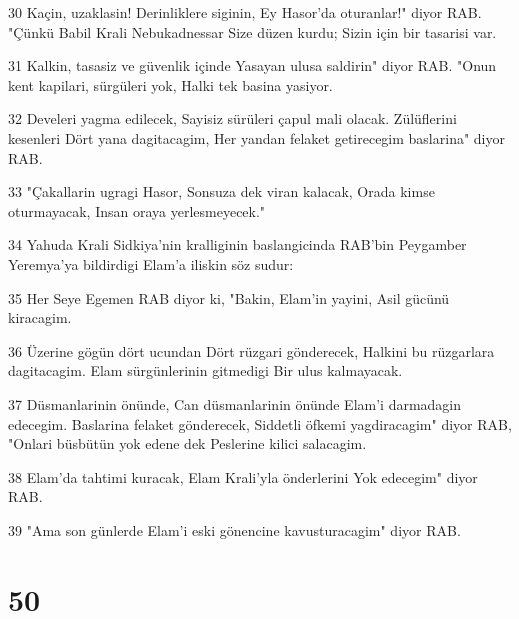 \par 30 Kaçin, uzaklasin! Derinliklere siginin, Ey Hasor'da oturanlar!" diyor RAB. "Çünkü Babil Krali Nebukadnessar Size düzen kurdu; Sizin için bir tasarisi var.
\par 31 Kalkin, tasasiz ve güvenlik içinde Yasayan ulusa saldirin" diyor RAB. "Onun kent kapilari, sürgüleri yok, Halki tek basina yasiyor.
\par 32 Develeri yagma edilecek, Sayisiz sürüleri çapul mali olacak. Zülüflerini kesenleri Dört yana dagitacagim, Her yandan felaket getirecegim baslarina" diyor RAB.
\par 33 "Çakallarin ugragi Hasor, Sonsuza dek viran kalacak, Orada kimse oturmayacak, Insan oraya yerlesmeyecek."
\par 34 Yahuda Krali Sidkiya'nin kralliginin baslangicinda RAB'bin Peygamber Yeremya'ya bildirdigi Elam'a iliskin söz sudur:
\par 35 Her Seye Egemen RAB diyor ki, "Bakin, Elam'in yayini, Asil gücünü kiracagim.
\par 36 Üzerine gögün dört ucundan Dört rüzgari gönderecek, Halkini bu rüzgarlara dagitacagim. Elam sürgünlerinin gitmedigi Bir ulus kalmayacak.
\par 37 Düsmanlarinin önünde, Can düsmanlarinin önünde Elam'i darmadagin edecegim. Baslarina felaket gönderecek, Siddetli öfkemi yagdiracagim" diyor RAB, "Onlari büsbütün yok edene dek Peslerine kilici salacagim.
\par 38 Elam'da tahtimi kuracak, Elam Krali'yla önderlerini Yok edecegim" diyor RAB.
\par 39 "Ama son günlerde Elam'i eski gönencine kavusturacagim" diyor RAB.

\chapter{50}

